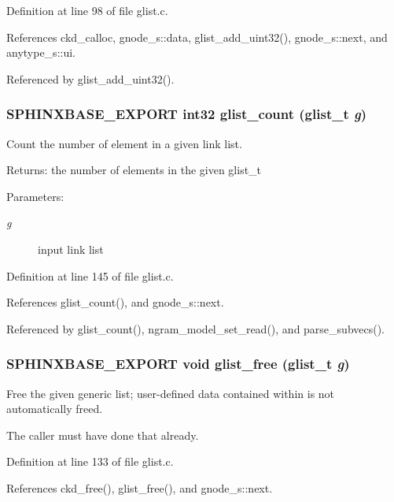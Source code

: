 Definition at line 98 of file glist.c.

References ckd\_\-calloc, gnode\_\-s::data, glist\_\-add\_\-uint32(), gnode\_\-s::next, and anytype\_\-s::ui.

Referenced by glist\_\-add\_\-uint32().
\subsubsection[{glist\_\-count}]{\setlength{\rightskip}{0pt plus 5cm}SPHINXBASE\_\-EXPORT int32 glist\_\-count ({\bf glist\_\-t} {\em g})}\label{glist_8h_eb046e39c540d2f5f792119ea0d24c48}


Count the number of element in a given link list. 

\begin{Desc}
\item[Returns:]the number of elements in the given glist\_\-t \end{Desc}
\begin{Desc}
\item[Parameters: ]\par
\begin{description}
\item[{\em 
g}]input link list \end{description}
\end{Desc}


Definition at line 145 of file glist.c.

References glist\_\-count(), and gnode\_\-s::next.

Referenced by glist\_\-count(), ngram\_\-model\_\-set\_\-read(), and parse\_\-subvecs().
\subsubsection[{glist\_\-free}]{\setlength{\rightskip}{0pt plus 5cm}SPHINXBASE\_\-EXPORT void glist\_\-free ({\bf glist\_\-t} {\em g})}\label{glist_8h_45380e15d2c33afc554fd60a8828580c}


Free the given generic list; user-defined data contained within is not automatically freed. 

The caller must have done that already. 

Definition at line 133 of file glist.c.

References ckd\_\-free(), glist\_\-free(), and gnode\_\-s::next.

